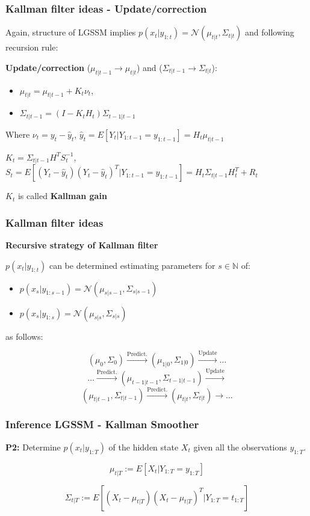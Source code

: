 \documentclass[xcolor=dvipsnames, compress]{beamer}
\newcommand{\N}{\ensuremath{\mathbb{N}}}
\begin{document}
\begin{frame}
\frametitle{Kallman filter ideas - Update/correction} 
Again, structure of LGSSM implies $p(x_t| y_{1:t})=\mathcal{N}( \mu_{t|t}, \Sigma_{t|t})$ and following recursion rule: \vspace{0.5cm}

\textbf{Update/correction} ($\mu_{t|t-1} \rightarrow \mu_{t|t} $) and ($\Sigma_{t|t-1} \rightarrow \Sigma_{t|t} $):
\begin{itemize}
	\item $\mu_{t|t} = \mu_{t|t-1} + K_{t} \nu_{t}$, 
	\item$\Sigma_{t|t-1} = (I-K_t H_t) \Sigma_{t-1|t-1}$
\end{itemize}

Where $\nu_t = y_t - \hat{y}_t$, $\hat{y}_t=E[Y_t|Y_{1:t-1}=y_{1:t-1}]=H_t\mu_{t|t-1}$ 

$K_t=\Sigma_{t|t-1}H^T S_t^{-1}$, $S_t=E[(Y_t - \hat{y}_t)(Y_t - \hat{y}_t)^T | Y_{1:t-1} = y_{1:t-1} ] = H_t\Sigma_{t|t-1}H_t^T +R_t$

$K_t$ is called \textbf{Kallman gain}
\end{frame}

\begin{frame}
\frametitle{Kallman filter ideas} 

\textbf{Recursive strategy of Kallman filter}

$p(x_t|y_{1:t})$ can be determined estimating parameters for $s\in \N$ of:
\begin{itemize}
\item $p(x_s| y_{1:s-1})=\mathcal{N}( \mu_{s|s-1}, \Sigma_{s|s-1})$
\item $p(x_s| y_{1:s})=\mathcal{N}( \mu_{s|s}, \Sigma_{s|s})$
\end{itemize}

as follows:

$$(\mu_0, \Sigma_0) \xrightarrow[]{\text{Predict.}} (\mu_{1|0}, \Sigma_{1|0}) \xrightarrow[]{\text{Update}} \ldots $$ 
$$\ldots \xrightarrow[]{\text{Predict.}} (\mu_{t-1|t-1}, \Sigma_{t-1|t-1})\xrightarrow[]{\text{Update}}$$ 
$$(\mu_{t|t-1}, \Sigma_{t|t-1}) \xrightarrow[]{\text{Predict.}} (\mu_{t|t}, \Sigma_{t|t}) \xrightarrow[]{\text{}} \ldots $$

\end{frame}

\begin{frame}
\frametitle{Inference LGSSM - Kallman Smoother}

 \textbf{P2:} Determine $p(x_t|y_{1:T})$ of the hidden state $X_t$ given all the observations $y_{1:T}$. 

\begin{equation}
\mu_{t|T}:= E[X_t | Y_{1:T} = y_{1:T} ]
\end{equation}

\begin{equation}
\Sigma_{t|T}:= E[(X_t -\mu_{t|T}) (X_t -\mu_{t|T})^T | Y_{1:T} = t_{1:T} ]
\end{equation}

\end{frame}
\end{document}
